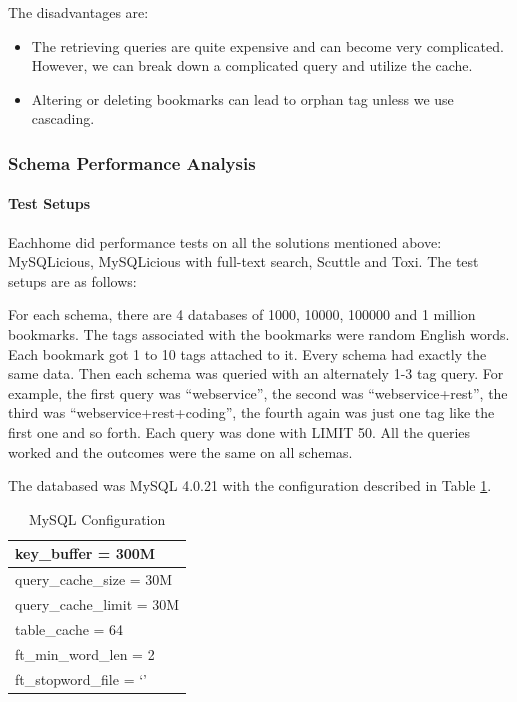 The disadvantages are:
\begin{itemize}
   \item The retrieving queries are quite expensive and can become very complicated. However, we can break down a complicated query and utilize the cache.
   \item Altering or deleting bookmarks can lead to orphan tag unless we use cascading.
\end{itemize}

\subsubsection{Schema Performance Analysis}
\paragraph{Test Setups}
Eachhome \cite{puiperformance} did performance tests on all the solutions mentioned above: MySQLicious, MySQLicious with full-text search, Scuttle and Toxi. The test setups are as follows:

For each schema, there are 4 databases of 1000, 10000, 100000 and 1 million bookmarks. The tags associated with the bookmarks were random English words. Each bookmark got 1 to 10 tags attached to it. Every schema had exactly the same data. Then each schema was queried with an alternately 1-3 tag query. For example, the first query was ``webservice'', the second was ``webservice+rest'', the third was ``webservice+rest+coding'', the fourth again was just one tag like the first one and so forth. 
Each query was done with LIMIT 50. All the queries worked and the outcomes were the same on all schemas.

The databased was MySQL 4.0.21 with the configuration described in Table \ref{tb:mysqlconfig}.

\begin{table}[!ht]
\centering
\caption{MySQL Configuration}\label{tb:mysqlconfig}
\begin{tabular}{| l |} \hline
key\_buffer = 300M \\ \hline
query\_cache\_size = 30M \\ \hline
query\_cache\_limit = 30M \\ \hline
table\_cache = 64 \\ \hline
ft\_min\_word\_len = 2 \\ \hline
ft\_stopword\_file = `' \\ \hline
\end{tabular}
\end{table}

